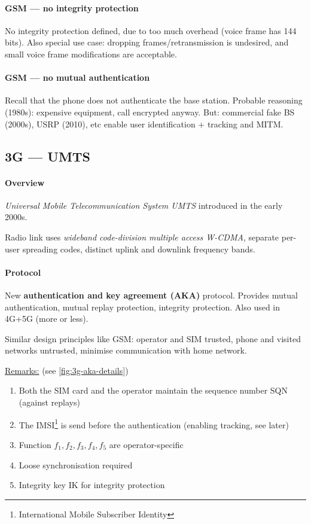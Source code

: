 \paragraph{GSM --- no integrity protection}
No integrity protection defined, due to too much overhead (voice frame has 144
bits). Also special use case: dropping frames/retransmission is undesired, and
small voice frame modifications are acceptable.

\paragraph{GSM --- no mutual authentication}
Recall that the phone does not authenticate the base station. Probable
reasoning (1980s): expensive equipment, call encrypted anyway. But: commercial
fake BS (2000s), USRP (2010), etc enable user identification + tracking and
MITM.

\subsection{3G --- UMTS}

\paragraph{Overview}
\textit{Universal Mobile Telecommunication System UMTS} introduced in the early 2000s.

Radio link uses \textit{wideband code-division multiple access W-CDMA},
separate per-user spreading codes, distinct uplink and downlink frequency
bands.

\paragraph{Protocol}
New \textbf{authentication and key agreement (AKA)} protocol. Provides mutual
authentication, mutual replay protection, integrity protection. Also used in
4G+5G (more or less).

Similar design principles like GSM: operator and SIM trusted, phone and visited
networks untrusted, minimise communication with home network.

\underline{Remarks:} (see \autoref{fig:3g-aka-details})
\begin{enumerate}
	\item Both the SIM card and the operator maintain the sequence number SQN (against
	      replays)
	\item The IMSI\footnote{International Mobile Subscriber Identity} is send before the
	      authentication (enabling tracking, see later)
	\item Function $f_1, f_2, f_3, f_4, f_5$ are operator-specific
	\item Loose synchronisation required
	\item Integrity key IK for integrity protection
\end{enumerate}

